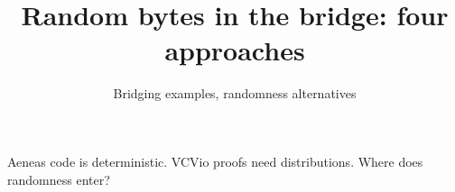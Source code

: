 

\title{Random bytes in the bridge: four approaches}
\subtitle{Bridging examples, randomness alternatives}

\newcommand{\source}[1]{\vspace*{-0.6em}{\footnotesize\textcolor{trustc}{#1}}\par\vspace{0.2em}}
\newcommand{\slidenote}[1]{\par\vspace{0.6em}\centering{\footnotesize #1}\par}
\newcommand{\slidebullets}[1]{\par\vspace{0.4em}\centering
  \begin{minipage}{0.92\textwidth}\footnotesize
    \begin{itemize}\setlength{\itemsep}{0.15em}#1\end{itemize}
  \end{minipage}\par\vspace{0.5em}}
\newcommand{\pro}{\textcolor{proofc}{\textbf{+}}}
\newcommand{\con}{\textcolor{gapc}{\textbf{--}}}
\newcommand{\yes}{\textcolor{proofc}{\textbf{yes}}}
\newcommand{\no}{\textcolor{gapc}{\textbf{no}}}
\newcommand{\proscons}[2]{%
  \vspace{0.6em}
  \raggedright
  \begin{columns}[T]
    \column{0.42\textwidth}\scriptsize
    \textbf{\textcolor{proofc}{For}}\\[0.2em] #1
    \column{0.42\textwidth}\scriptsize
    \textbf{\textcolor{gapc}{Against}}\\[0.2em] #2
  \end{columns}}



\begin{frame}
  \titlepage
  \centering
  {\footnotesize\textcolor{trustc}{Aeneas code is deterministic. VCVio proofs need
  distributions. Where does randomness enter?}}
\end{frame}

